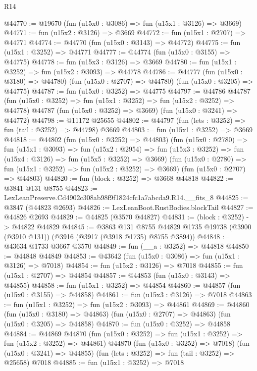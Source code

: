 \begin{lexlean}{R14}
\begin{coremodule}
@44770 := @19670 (fun (u15x0 : @3086) => fun (u15x1 : @3126) => @3669)
@44771 := fun (u15x2 : @3126) => @3669
@44772 := fun (u15x1 : @2707) => @44771
@44774 := @44770 (fun (u15x0 : @3143) => @44772)
@44775 := fun (u15x1 : @3252) => @44771
@44777 := @44774 (fun (u15x0 : @3155) => @44775)
@44778 := fun (u15x3 : @3126) => @3669
@44780 := fun (u15x1 : @3252) => fun (u15x2 : @3093) => @44778
@44786 := @44777
    (fun (u15x0 : @3180) => @44780)
    (fun (u15x0 : @2707) => @44780)
    (fun (u15x0 : @3205) => @44775)
@44787 := fun (u15x0 : @3252) => @44775
@44797 := @44786
    @44787
    (fun (u15x0 : @3252) => fun (u15x1 : @3252) => fun (u15x2 : @3252) => @44778)
    @44787
    (fun (u15x0 : @3252) => @3669)
    (fun (u15x0 : @3241) => @44772)
@44798 := @11172 @25655
@44802 := @44797 (fun (lets : @3252) => fun (tail : @3252) => @44798) @3669
@44803 := fun (u15x1 : @3252) => @3669
@44818 := @44802
    (fun (u15x0 : @3252) => @44803)
    (fun (u15x0 : @2780) =>
    fun (u15x1 : @3093) =>
    fun (u15x2 : @2954) =>
    fun (u15x3 : @3252) => fun (u15x4 : @3126) => fun (u15x5 : @3252) => @3669)
    (fun (u15x0 : @2780) => fun (u15x1 : @3252) => fun (u15x2 : @3252) => @3669)
    (fun (u15x0 : @2707) => @44803)
@44820 := fun (block : @3252) => @3668 @44818
@44822 := @3841 @131 @8755
@44823 := LexLeanPreserve.Cd4902c308ab98f9f1824cfc1a7abcda9.R14.__fits_8
@44825 := @3847 (@44823 @2693)
@44826 := LexLeanBoot.RustBodies.blockTail
@44827 := @44826 @2693
@44829 := @44825 (@3570 @44827)
@44831 := (block : @3252) -> @44822 @44829
@44845 := @3863
    @131
    @8755
    @44829
    @1735
    @19738
    (@3900 (@3910 @131))
    (@3916 (@3917 (@3918 @1735) @8755 @3894))
@44848 := @43634 @1733 @3667 @3570
@44849 := fun (__a : @3252) => @44818
@44850 := @44848 @44849
@44853 := @43642 (fun (u15x0 : @3086) => fun (u15x1 : @3126) => @7018)
@44854 := fun (u15x2 : @3126) => @7018
@44855 := fun (u15x1 : @2707) => @44854
@44857 := @44853 (fun (u15x0 : @3143) => @44855)
@44858 := fun (u15x1 : @3252) => @44854
@44860 := @44857 (fun (u15x0 : @3155) => @44858)
@44861 := fun (u15x3 : @3126) => @7018
@44863 := fun (u15x1 : @3252) => fun (u15x2 : @3093) => @44861
@44869 := @44860
    (fun (u15x0 : @3180) => @44863)
    (fun (u15x0 : @2707) => @44863)
    (fun (u15x0 : @3205) => @44858)
@44870 := fun (u15x0 : @3252) => @44858
@44884 := @44869
    @44870
    (fun (u15x0 : @3252) => fun (u15x1 : @3252) => fun (u15x2 : @3252) => @44861)
    @44870
    (fun (u15x0 : @3252) => @7018)
    (fun (u15x0 : @3241) => @44855)
    (fun (lets : @3252) => fun (tail : @3252) => @25658)
    @7018
@44885 := fun (u15x1 : @3252) => @7018

\end{coremodule}
\end{lexlean}

